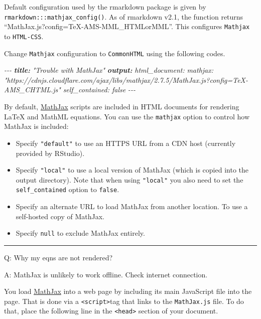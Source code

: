 \documentclass[
  a4paper,
  twoside,
  openright]{book}
\newenvironment{Shaded}{\begin{snugshade}}{\end{snugshade}}
\newcommand{\AnnotationTok}[1]{\textcolor[rgb]{0.56,0.35,0.01}{\textbf{\textit{#1}}}}
\newcommand{\CommentTok}[1]{\textcolor[rgb]{0.56,0.35,0.01}{\textit{#1}}}
\providecommand{\tightlist}{%
  \setlength{\itemsep}{0pt}\setlength{\parskip}{0pt}}
\theoremstyle{definition}
\theoremstyle{definition}
\theoremstyle{definition}
\theoremstyle{definition}
\theoremstyle{remark}
\begin{document}
Default configuration used by the rmarkdown package is given by \texttt{rmarkdown:::mathjax\_config()}. As of rmarkdown v2.1, the function returns ``MathJax.js?config=TeX-AMS-MML\_HTMLorMML''. This configures \texttt{Mathjax} to \texttt{HTML-CSS}.

Change \texttt{Mathjax} configuration to \texttt{CommonHTML} using the following codes.

\begin{Shaded}
\begin{Highlighting}[]
\CommentTok{{-}{-}{-}}
\AnnotationTok{title:}\CommentTok{ "Trouble with MathJax"}
\AnnotationTok{output:}\CommentTok{ }
\CommentTok{  html\_document:}
\CommentTok{    mathjax: "https://cdnjs.cloudflare.com/ajax/libs/mathjax/2.7.5/MathJax.js?config=TeX{-}AMS\_CHTML.js"}
\CommentTok{    self\_contained: false    }
\CommentTok{{-}{-}{-}}
\end{Highlighting}
\end{Shaded}

By default, \href{https://www.mathjax.org/}{MathJax} scripts are included in HTML documents for rendering LaTeX and MathML equations. You can use the \texttt{mathjax} option to control how MathJax is included:

\begin{itemize}
\tightlist
\item
  Specify \texttt{"default"} to use an HTTPS URL from a CDN host (currently provided by RStudio).
\item
  Specify \texttt{"local"} to use a local version of MathJax (which is copied into the output directory). Note that when using \texttt{"local"} you also need to set the \texttt{self\_contained} option to \texttt{false}.
\item
  Specify an alternate URL to load MathJax from another location. To use a self-hosted copy of MathJax.
\item
  Specify \texttt{null} to exclude MathJax entirely.
\end{itemize}

\begin{center}\rule{0.5\linewidth}{0.5pt}\end{center}

Q: Why my eqns are not rendered?

A: MathJax is unlikely to work offline. Check internet connection.

You load \href{https://docs.mathjax.org/en/stable/configuration.html}{MathJax} into a web page by including its main JavaScript file into the page. That is done via a \texttt{\textless{}script\textgreater{}}tag that links to the \texttt{MathJax.js} file. To do that, place the following line in the \texttt{\textless{}head\textgreater{}} section of your document.
\end{document}
